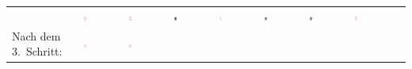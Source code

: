 \begin{tabular}{m{30mm}m{11mm}m{11mm}m{11mm}m{11mm}m{11mm}m{11mm}m{11mm}m{11mm}}
&
\includegraphics[width=0.08\textwidth]{./inf/SEKII/19_Java_Sortierverfahren/Karo8.png}
&
\includegraphics[width=0.08\textwidth]{./inf/SEKII/19_Java_Sortierverfahren/Karo10.png}
&
\includegraphics[width=0.08\textwidth]{./inf/SEKII/19_Java_Sortierverfahren/KaroBube.png}
&
\includegraphics[width=0.08\textwidth]{./inf/SEKII/19_Java_Sortierverfahren/KaroAs.png}
&
\includegraphics[width=0.08\textwidth]{./inf/SEKII/19_Java_Sortierverfahren/KaroKoenig.png}
&
\includegraphics[width=0.08\textwidth]{./inf/SEKII/19_Java_Sortierverfahren/KaroDame.png}
&
\includegraphics[width=0.08\textwidth]{./inf/SEKII/19_Java_Sortierverfahren/Karo9.png}
\\
Nach dem 3.\ Schritt: &
\includegraphics[width=0.08\textwidth]{./inf/SEKII/19_Java_Sortierverfahren/Karo7.png}
&
\includegraphics[width=0.08\textwidth]{./inf/SEKII/19_Java_Sortierverfahren/Karo8.png}

\end{tabular}
